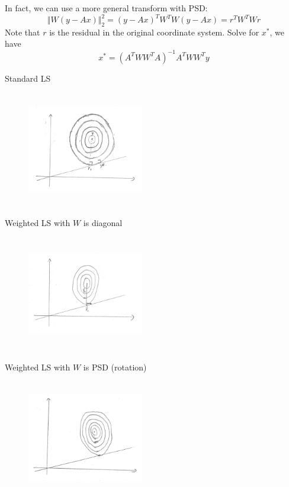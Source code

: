 In fact, we can use a more general transform with PSD:
$$\Vert W (y-Ax)\Vert ^2_2 = (y-Ax)^TW^TW(y-Ax)=r^TW^TWr$$
Note that $r$ is the residual in the original coordinate system. Solve for $x^*$, we have 
$$x^*=(A^T W W^T A)^{-1} A^T W W^T y$$

\vspace{0.3cm}
Standard LS
\begin{figure}
	\centering
	\includegraphics[width=2in,height=2in]{figures/ch06/ch06-03.jpg}
\end{figure}

Weighted LS with $W$ is diagonal 

\begin{figure}
	\centering
	\includegraphics[width=2in,height=2in]{figures/ch06/ch06-04.jpg}
\end{figure}

Weighted LS with $W$ is PSD (rotation)

\begin{figure}
	\centering
	\includegraphics[width=2in,height=2in]{figures/ch06/ch06-05.jpg}
\end{figure}



